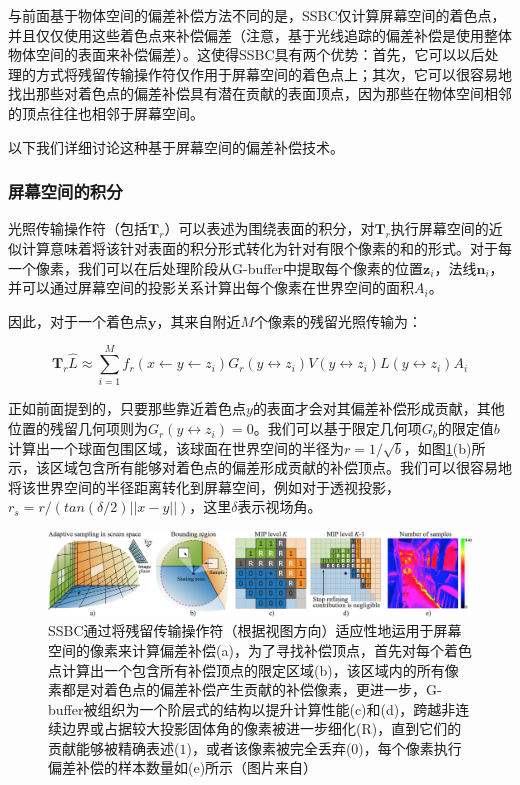 与前面基于物体空间的偏差补偿方法不同的是，SSBC仅计算屏幕空间的着色点，并且仅仅使用这些着色点来补偿偏差（注意，基于光线追踪的偏差补偿是使用整体物体空间的表面来补偿偏差）。这使得SSBC具有两个优势：首先，它可以以后处理的方式将残留传输操作符仅作用于屏幕空间的着色点上；其次，它可以很容易地找出那些对着色点的偏差补偿具有潜在贡献的表面顶点，因为那些在物体空间相邻的顶点往往也相邻于屏幕空间。

以下我们详细讨论这种基于屏幕空间的偏差补偿技术。




\subsubsection{屏幕空间的积分}
光照传输操作符（包括$\mathbf{T}_r$）可以表述为围绕表面的积分，对$\mathbf{T}_r$执行屏幕空间的近似计算意味着将该针对表面的积分形式转化为针对有限个像素的和的形式。对于每一个像素，我们可以在后处理阶段从G-buffer中提取每个像素的位置$\mathbf{z}_i$，法线$\mathbf{n}_i$，并可以通过屏幕空间的投影关系计算出每个像素在世界空间的面积$A_i$。

因此，对于一个着色点$\mathbf{y}$，其来自附近$M$个像素的残留光照传输为：

\begin{equation}\label{e:ir-operator}
	\mathbf{T}_r\hat{L}\approx\sum^{M}_{i=1}f_r(x\leftarrow y\leftarrow z_i)G_r(y\leftrightarrow z_i)V(y\leftrightarrow z_i)L(y\leftrightarrow z_i)A_i
\end{equation}

\noindent 正如前面提到的，只要那些靠近着色点$y$的表面才会对其偏差补偿形成贡献，其他位置的残留几何项则为$G_r(y\leftrightarrow z_i)=0$。我们可以基于限定几何项$G_b$的限定值$b$计算出一个球面包围区域，该球面在世界空间的半径为$r=1/\sqrt{b}$，如图\ref{f:ir-ssbc}(b)所示，该区域包含所有能够对着色点的偏差形成贡献的补偿顶点。我们可以很容易地将该世界空间的半径距离转化到屏幕空间，例如对于透视投影，$r_s=r/(tan(\delta /2)||x-y||)$，这里$\delta$表示视场角。

\begin{figure}
\begin{fullwidth}	
	\includegraphics[width=1.0\thewidth]{figures/ir/ir-6-1}
	\caption{SSBC通过将残留传输操作符（根据视图方向）适应性地运用于屏幕空间的像素来计算偏差补偿(a)，为了寻找补偿顶点，首先对每个着色点计算出一个包含所有补偿顶点的限定区域(b)，该区域内的所有像素都是对着色点的偏差补偿产生贡献的补偿像素，更进一步，G-buffer被组织为一个阶层式的结构以提升计算性能(c)和(d)，跨越非连续边界或占据较大投影固体角的像素被进一步细化(R)，直到它们的贡献能够被精确表述($1$)，或者该像素被完全丢弃($0$)，每个像素执行偏差补偿的样本数量如(e)所示（图片来自\cite{a:Screen-SpaceBiasCompensationfor}）}
	\label{f:ir-ssbc}
\end{fullwidth}
\end{figure}


